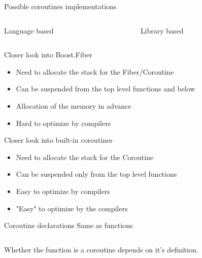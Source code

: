 \documentclass[10pt]{beamer}
\begin{document}
\begin{frame}{Possible coroutines implementations}

\begin{columns}
\begin{column}{0.48\linewidth}
  Language based
\end{column}

\begin{column}{0.48\linewidth}
  Library based
\end{column}
\end{columns}

\end{frame}

\begin{frame}{Closer look into Boost.Fiber}
  \begin{itemize}[<+- |alert@+>]
  \item Need to allocate the stack for the Fiber/Coroutine
  \item Can be suspended from the top level functions and below
  \item Allocation of the memory in advance
  \item Hard to optimize by compilers
  \end{itemize}
\end{frame}

\begin{frame}{Closer look into built-in coroutines}
  \begin{itemize}[<+- |alert@+>]
  \item Need to allocate the stack for the Coroutine
  \item Can be suspended only from the top level functions
  \item Easy to optimize by compilers
  \item "Easy" to optimize by the compilers
  \end{itemize}
\end{frame}

\begin{frame}[fragile]{Coroutine declarations}
  \centering Same as functions

  \vfill
  \begin{center}
  \begin{minipage}{0.7\linewidth}
  \inputminted{c++}{code-examples/intro/declaration.hpp}
  \end{minipage}
  \end{center}
  \vfill

  Whether the function is a coroutine depends on it's definition.

\end{frame}
\end{document}
